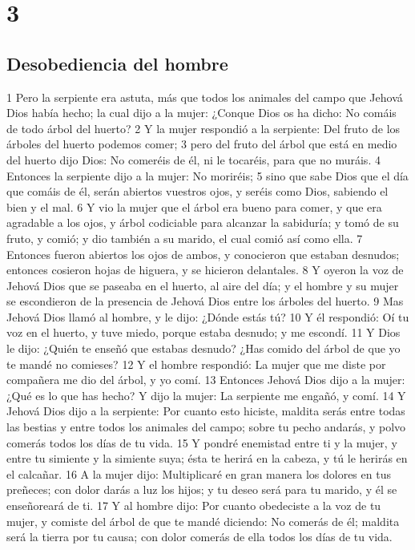 \chapter{3}

\section*{Desobediencia del hombre}

1 Pero la serpiente era astuta, más que todos los animales del campo que Jehová Dios había hecho; la cual dijo a la mujer: ¿Conque Dios os ha dicho: No comáis de todo árbol del huerto?
2 Y la mujer respondió a la serpiente: Del fruto de los árboles del huerto podemos comer;
3 pero del fruto del árbol que está en medio del huerto dijo Dios: No comeréis de él, ni le tocaréis, para que no muráis.
4 Entonces la serpiente dijo a la mujer: No moriréis;
5 sino que sabe Dios que el día que comáis de él, serán abiertos vuestros ojos, y seréis como Dios, sabiendo el bien y el mal.
6 Y vio la mujer que el árbol era bueno para comer, y que era agradable a los ojos, y árbol codiciable para alcanzar la sabiduría; y tomó de su fruto, y comió; y dio también a su marido, el cual comió así como ella.
7 Entonces fueron abiertos los ojos de ambos, y conocieron que estaban desnudos; entonces cosieron hojas de higuera, y se hicieron delantales.
8 Y oyeron la voz de Jehová Dios que se paseaba en el huerto, al aire del día; y el hombre y su mujer se escondieron de la presencia de Jehová Dios entre los árboles del huerto.
9 Mas Jehová Dios llamó al hombre, y le dijo: ¿Dónde estás tú?
10 Y él respondió: Oí tu voz en el huerto, y tuve miedo, porque estaba desnudo; y me escondí.
11 Y Dios le dijo: ¿Quién te enseñó que estabas desnudo? ¿Has comido del árbol de que yo te mandé no comieses?
12 Y el hombre respondió: La mujer que me diste por compañera me dio del árbol, y yo comí.
13 Entonces Jehová Dios dijo a la mujer: ¿Qué es lo que has hecho? Y dijo la mujer: La serpiente me engañó, y comí.
14 Y Jehová Dios dijo a la serpiente: Por cuanto esto hiciste, maldita serás entre todas las bestias y entre todos los animales del campo; sobre tu pecho andarás, y polvo comerás todos los días de tu vida.
15 Y pondré enemistad entre ti y la mujer, y entre tu simiente y la simiente suya; ésta te herirá en la cabeza, y tú le herirás en el calcañar.
16 A la mujer dijo: Multiplicaré en gran manera los dolores en tus preñeces; con dolor darás a luz los hijos; y tu deseo será para tu marido, y él se enseñoreará de ti.
17 Y al hombre dijo: Por cuanto obedeciste a la voz de tu mujer, y comiste del árbol de que te mandé diciendo: No comerás de él; maldita será la tierra por tu causa; con dolor comerás de ella todos los días de tu vida.
